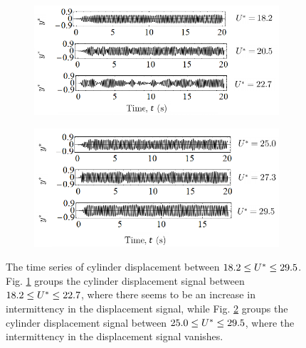 \documentclass[a4paper,fleqn]{cas-sc}
\begin{document}
\begin{figure}
  \centering
  \begin{subfigure}[h]{0.49\textwidth}
    \includegraphics[width=\textwidth]{figs/figure11a}
    \caption{}
    \label{fig:unstableSVIV}
  \end{subfigure}

  \begin{subfigure}[h]{0.49\textwidth}
    \includegraphics[width=\textwidth]{figs/figure11b}
    \caption{}
    \label{fig:stableSVIV}
  \end{subfigure}

  \caption{The time series of cylinder displacement between $18.2 \leq U^{*} \leq 29.5$. Fig. \ref{fig:unstableSVIV} groups the cylinder displacement signal between $18.2 \leq U^{*} \leq 22.7$, where there seems to be an increase in intermittency in the displacement signal, while Fig. \ref{fig:stableSVIV} groups the cylinder displacement signal between $25.0 \leq U^{*} \leq 29.5$, where the intermittency in the displacement signal vanishes.} \label{fig:cylDispSignal}
\end{figure}
\end{document}
